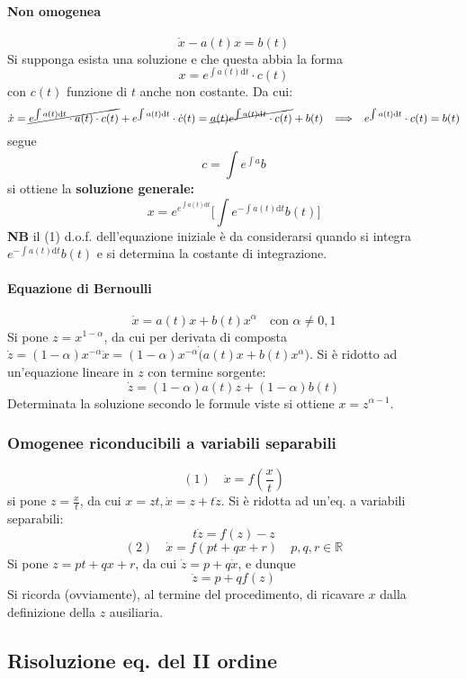 \documentclass[10pt]{article}
\theoremstyle{plain}
\begin{document}
\paragraph{Non omogenea}
\[\dot x - a(t) x = b(t)\]
Si supponga esista una soluzione e che questa abbia la forma
\[x = e^{\int a(t) \textrm{d}t} \cdot c(t)\]
con $c(t)$ funzione di $t$ anche non costante. Da cui:
\[\dot x = \cancel{e^{\int a(t) \textrm{d}t} \cdot a(t) \cdot c(t)} + e^{\int a(t) \textrm{d}t} \cdot \dot c (t) = \cancel{a(t) e^{\int a(t) \textrm{d}t} \cdot c(t)} + b(t) \enspace \implies \enspace e^{\int a(t) \textrm{d}t} \cdot c(t) = b(t)\]
segue
\[c = \int e^{\int a} b\]
si ottiene la \textbf{soluzione generale:}
\[\boxed{x = e^{e^{\int a(t) \textrm{d}t}} \big[\int e^{- \int a(t) \textrm{d}t} b(t)\big]}\]
\textbf{NB} il (1) d.o.f. dell'equazione iniziale è da considerarsi quando si integra $e^{- \int a(t) \textrm{d}t} b(t)$ e si determina la costante di integrazione.

\paragraph{Equazione di Bernoulli}
\[\dot x = a(t) x + b(t) x^\alpha \quad \textrm{con } \alpha \neq 0,1\]
Si pone $\displaystyle z = x^{1-\alpha}$, da cui per derivata di composta $\displaystyle \dot z = (1-\alpha) x^{-\alpha}\dot x = (1-\alpha) x^{-\alpha}\dot (a(t) x + b(t) x^\alpha)$. Si è ridotto ad un'equazione lineare in $z$ con termine sorgente:
\[\dot z = (1-\alpha)a(t) z + (1-\alpha) b(t)\]
Determinata la soluzione secondo le formule viste si ottiene $x = z^{\alpha - 1}$.

\subsubsection{Omogenee riconducibili a variabili separabili}
\[(1) \quad \dot x = f(\frac{x}{t})\]
si pone $\displaystyle z = \frac{x}{t}$, da cui $x = zt, \dot x = z + t \dot z$. Si è ridotta ad un'eq. a variabili separabili:
\[t \dot z = f(z) - z\]
\[(2) \quad \dot x = f(pt + q x + r) \quad p, q, r \in \mathbb{R}\]
Si pone $z = pt + q x + r$, da cui $\dot z = p + q \dot x$, e dunque
\[\dot z = p + q f(z)\]
Si ricorda (ovviamente), al termine del procedimento, di ricavare $x$ dalla definizione della $z$ ausiliaria.

\subsection{Risoluzione eq. del II ordine}
\end{document}
